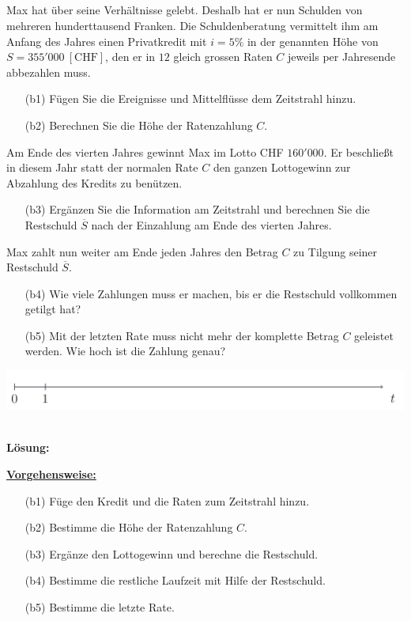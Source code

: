 \subsection*{}
Max hat über seine Verhältnisse gelebt. 
Deshalb hat er nun Schulden von mehreren hunderttausend Franken.
Die Schuldenberatung vermittelt ihm am Anfang des Jahres einen Privatkredit mit $ i = 5 \% $ in der genannten Höhe von $ S = 355'000 \ [\textrm{CHF}] $, den er in $ 12 $ gleich grossen Raten $ C $ jeweils per Jahresende abbezahlen muss. 
\begin{enumerate}
	\item[(b1)] Fügen Sie die Ereignisse und Mittelflüsse dem Zeitstrahl hinzu.
	\item[(b2)] Berechnen Sie die Höhe der Ratenzahlung $ C $.
\end{enumerate}
Am Ende des vierten Jahres gewinnt Max im Lotto CHF $ 160'000 $.
Er beschließt in diesem Jahr statt der normalen Rate $ C $ den ganzen Lottogewinn zur Abzahlung des Kredits zu benützen.
\begin{enumerate}
	\item[(b3)] Ergänzen Sie die Information am Zeitstrahl und berechnen Sie die Restschuld $ \overline{S} $ nach der Einzahlung am Ende des vierten Jahres.
\end{enumerate}
Max zahlt nun weiter am Ende jeden Jahres den Betrag $ C $ zu Tilgung seiner Restschuld $ \overline{S} $.
\begin{enumerate}
	\item[(b4)] Wie viele Zahlungen muss er machen, bis er die Restschuld vollkommen getilgt hat?
	\item[(b5)] Mit der letzten Rate muss nicht mehr der komplette Betrag $ C $ geleistet werden. Wie hoch ist die Zahlung genau?
\end{enumerate}
\begin{center}
	\includegraphics[scale=0.3]{pictures/zeitstrahl_1_b}
\end{center}
\ \\
\textbf{Lösung:}
\begin{mdframed}
\underline{\textbf{Vorgehensweise:}}
\begin{enumerate}
\item[(b1)] Füge den Kredit und die Raten zum Zeitstrahl hinzu.
\item[(b2)] Bestimme die Höhe der Ratenzahlung $ C $.
\item[(b3)] Ergänze den Lottogewinn und berechne die Restschuld.
\item[(b4)] Bestimme die restliche Laufzeit mit Hilfe der Restschuld.
\item[(b5)] Bestimme die letzte Rate.
\end{enumerate}
\end{mdframed}

